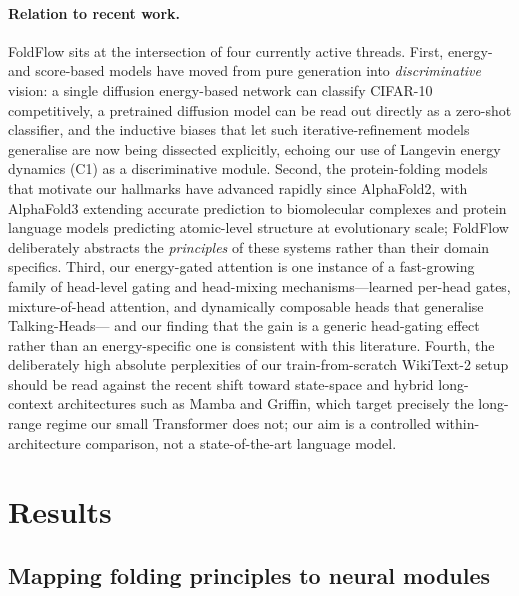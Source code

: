 \documentclass[fleqn,10pt]{article}
\begin{document}
\paragraph{Relation to recent work.} FoldFlow sits at the
intersection of four currently active threads. First, energy- and
score-based models have moved from pure generation into
\emph{discriminative} vision: a single diffusion energy-based
network can classify CIFAR-10 competitively,\cite{guo2023egc} a
pretrained diffusion model can be read out directly as a zero-shot
classifier,\cite{li2023diffusionclassifier} and the inductive biases
that let such iterative-refinement models generalise are now being
dissected explicitly,\cite{an2024inductivebias} echoing our use of
Langevin energy dynamics (C1) as a discriminative module. Second,
the protein-folding models that motivate our hallmarks have advanced
rapidly since AlphaFold2, with AlphaFold3 extending accurate
prediction to biomolecular complexes\cite{abramson2024alphafold3}
and protein language models predicting atomic-level structure at
evolutionary scale;\cite{lin2023esm2} FoldFlow deliberately abstracts
the \emph{principles} of these systems rather than their domain
specifics. Third, our energy-gated attention is one instance of a
fast-growing family of head-level gating and head-mixing
mechanisms---learned per-head gates,\cite{qiu2025gatedattention}
mixture-of-head attention,\cite{jin2024moh} and dynamically
composable heads that generalise Talking-Heads\cite{xiao2024dcmha}---
and our finding that the gain is a generic head-gating effect rather
than an energy-specific one is consistent with this literature.
Fourth, the deliberately high absolute perplexities of our
train-from-scratch WikiText-2 setup should be read against the
recent shift toward state-space and hybrid long-context
architectures such as Mamba\cite{gu2023mamba} and
Griffin,\cite{de2024griffin} which target precisely the long-range
regime our small Transformer does not; our aim is a controlled
within-architecture comparison, not a state-of-the-art language
model.

\section*{Results}
\label{sec:results}

\subsection*{Mapping folding principles to neural modules}
\end{document}
